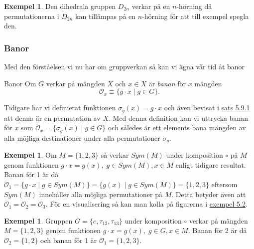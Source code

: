 \documentclass{article}
\newcommand{\orbit}[0]{\mathcal{O}}
\theoremstyle{definition}
\newtheorem{exmp}[thm]{Exempel}
\begin{document}
\begin{exmp}
  Den dihedrala gruppen $D_{2n}$ verkar på en $n$-hörning då permutationerna i $D_{2n}$ kan tillämpas på en $n$-hörning 
  för att till exempel spegla den.
\end{exmp}

\subsubsection{Banor}
Med den förståelsen vi nu har om gruppverkan så kan vi ägna vår tid åt banor
\begin{mydef}{Banor}{}
  Om $G$ verkar på mängden $X$ och $x \in X$ är \textit{banan} för $x$ mängden 
  \[\orbit_x \equiv \{g \cdot x \; | \; g \in G\}.\]
\end{mydef}
Tidigare har vi definierat funktionen $\sigma_g(x) = g \cdot x$ och även bevisat i 
\hyperlink{sats4.9.1}{sats 5.9.1} att 
denna är en permutation av $X$. Med denna definition kan vi uttrycka banan för $x$ som 
$\orbit_x = \{\sigma_g(x) \; | \; g \in G\}$ och 
således är ett elements bana mängden av alla möjliga destinationer under alla permutationer 
$\sigma_g$.

\begin{exmp}
  Om $M = \{1, 2, 3\}$ så verkar $Sym(M)$ under komposition $\circ$ på $M$ 
  genom funktionen $g \cdot x = g(x), \; g \in Sym(M), x \in M$ enligt tidigare resultat. Banan för 
  1 är då $\orbit_1 = \{g \cdot x \; | \; g \in Sym(M)\} = \{g(x) \; | \; g \in Sym(M)\}
  = \{1, 2, 3\}$ eftersom $Sym(M)$ innehåller alla möjliga permutationer på $M$.
  Detta betyder även att $\orbit_1 = \orbit_2 = \orbit_3$. För en visualisering så
  kan man kolla på figurerna i \hyperlink{exempel4.2}{exempel 5.2}.
\end{exmp}

\begin{exmp}
  Gruppen $G = \{e, \tau_{12}, \tau_{13}\}$ under komposition $\circ$ verkar på 
  mängden $M = \{1, 2, 3\}$ genom funktionen $g \cdot x = g(x), \; g \in G, x \in M$. 
  Banan för 2 är då $\orbit_2 = \{1, 2\}$ och banan för 1 är $\orbit_1 = \{1, 2, 3\}$.
\end{exmp}
\end{document}
